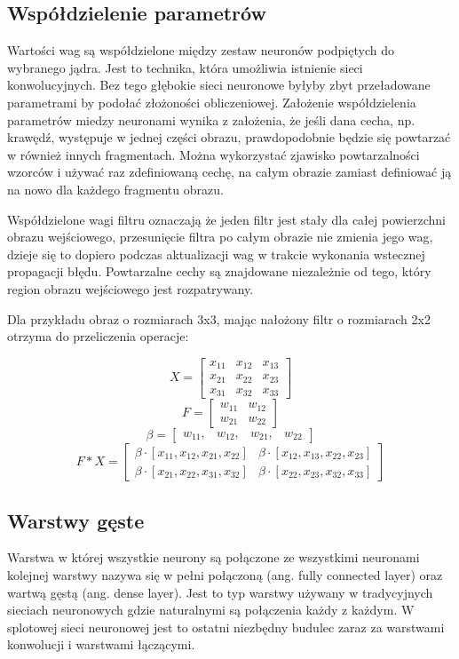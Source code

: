 \documentclass[12pt,a4paper,twoside,titlepage,openright]{book}
\begin{document}
\subsection{Współdzielenie parametrów}
Wartości wag są współdzielone między zestaw neuronów podpiętych do wybranego jądra. Jest to technika, która umożliwia istnienie sieci konwolucyjnych. Bez tego głębokie sieci neuronowe byłyby zbyt przeładowane parametrami by podołać złożoności obliczeniowej. Założenie współdzielenia parametrów miedzy neuronami wynika z założenia, że jeśli dana cecha, np. krawędź, występuje w jednej części obrazu, prawdopodobnie będzie się powtarzać w również innych fragmentach. Można wykorzystać zjawisko powtarzalności wzorców i używać raz zdefiniowaną cechę, na całym obrazie zamiast definiować ją na nowo dla każdego fragmentu obrazu.

Współdzielone wagi filtru oznaczają że jeden filtr jest stały dla całej powierzchni obrazu wejściowego, przesunięcie filtra po całym obrazie nie zmienia jego wag, dzieje się to dopiero podczas aktualizacji wag w trakcie wykonania wstecznej propagacji błędu. Powtarzalne cechy są znajdowane niezależnie od tego, który region obrazu wejściowego jest rozpatrywany.

Dla przykładu obraz o rozmiarach 3x3, mając nałożony filtr o rozmiarach 2x2 otrzyma do przeliczenia operacje:

 $$X = 
 \begin{bmatrix} 
 x_{11} & x_{12} & x_{13}  \\ x_{21} & x_{22} & x_{23} \\x_{31} & x_{32} & x_{33} 
 \end{bmatrix}
$$
$$F =  
 \begin{bmatrix} 
 w_{11} & w_{12} \\ w_{21} & w_{22} 
 \end{bmatrix}
$$
 $$\beta = 
 \begin{bmatrix} 
 w_{11}, & w_{12}, & w_{21}, & w_{22} 
 \end{bmatrix}
$$
 $$F * X =  
 \begin{bmatrix}  
\beta \cdot [x_{11}, x_{12}, x_{21}, x_{22}] & \beta \cdot [x_{12}, x_{13}, x_{22}, x_{23}] \\
\beta \cdot [x_{21}, x_{22}, x_{31}, x_{32}] & \beta \cdot [x_{22}, x_{23}, x_{32}, x_{33}] 
 \end{bmatrix}
$$

\subsection{Warstwy gęste}
Warstwa w której wszystkie neurony są połączone ze wszystkimi neuronami kolejnej warstwy nazywa się w pełni połączoną (ang. fully connected layer) oraz wartwą gęstą (ang. dense layer). Jest to typ warstwy używany w tradycyjnych sieciach neuronowych gdzie naturalnymi są połączenia każdy z każdym. W splotowej sieci neuronowej jest to ostatni niezbędny budulec zaraz za warstwami konwolucji i warstwami łączącymi.
\end{document}
